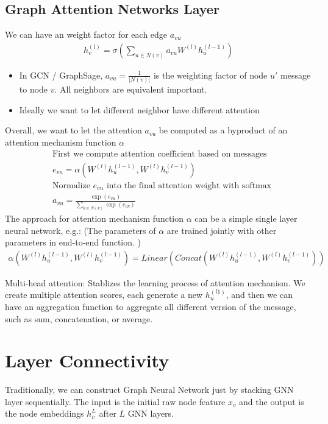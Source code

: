 \subsection{Graph Attention Networks Layer}
We can have an weight factor for each edge $a_{vu}$
    \begin{align*}
        h_v^{(l)} = \sigma(\sum_{u \in N(v)} a_{vu} W^{(l)}h_u^{(l-1)})
    \end{align*}
    \begin{itemize}
        \item In GCN / GraphSage, $a_{vu} = \frac{1}{|N(v)|}$ is the weighting factor of node $u'$ message to node $v$. All neighbors are equivalent important. 
        \item Ideally we want to let different neighbor have different attention
    \end{itemize}
Overall, we want to let the attention $a_{vu}$ be computed as a byproduct of an attention mechanism function $\alpha$
    \begin{align*}
        & \textrm{First we compute attention coefficient based on messages} \\
        & e_{vu} = \alpha(W^{(l)}h_u^{(l-1)}, W^{(l)}h_v^{(l-1)})\\
        & \textrm{Normalize $e_{vu}$ into the final attention weight with softmax}\\
        & a_{vu} = \frac{\exp(e_{vu})}{\sum_{k\in N(v)} \exp(e_{vk})}
    \end{align*}
The approach for attention mechanism function $\alpha$ can be a simple single layer neural network, e.g.: (The parameters of $\alpha$ are trained jointly with other parameters in end-to-end function. ) 
    \begin{align*}
        \alpha(W^{(l)}h_u^{(l-1)}, W^{(l)}h_v^{(l-1)}) = Linear(Concat(W^{(l)}h_u^{(l-1)}, W^{(l)}h_v^{(l-1)}))
    \end{align*}

Multi-head attention: Stablizes the learning process of attention mechanism. We create multiple attention scores, each generate a new $h_u^{(l1)}$, and then we can have an aggregation function to aggregate all different version of the message, such as sum, concatenation, or average. 





\section{Layer Connectivity}
Traditionally, we can construct Graph Neural Network just by stacking GNN layer sequentially. The input is the initial raw node feature $x_v$ and the output is the node embeddings $h_v^{L}$ after $L$ GNN layers. 

